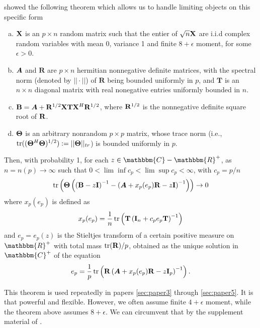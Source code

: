 \documentclass[oneside]{book}\usepackage{knitr}
\begin{document}
\citet{rubio2011spectral} showed the following theorem which allows us to handle limiting objects on this specific form
\begin{theorem}
\begin{enumerate}[(a)]
  \item $\mathbf{X}$ is an $p \times n$ random matrix such that the entier of $\sqrt{n}\mathbf{X}$ are i.i.d complex random variables with mean 0, variance 1 and finite $8+\epsilon$ moment, for some $\epsilon > 0$.
  \item $\mbox{\boldmath$A$}$ and $\mathbf{R}$ are $p \times n$ hermitian nonnegative definite matrices, with the spectral norm (denoted by $||\cdot||$) of $\mathbf{R}$ being bounded uniformly in $p$, and $\mathbf{T}$ is an $n \times n$ diagonal matrix with real nonegative entries  uniformly bounded in $n$.
  \item $\mathbf{B}=\mbox{\boldmath$A$} + \mathbf{R}^{1/2} \mathbf{X} \mathbf{T} \mathbf{X}^H \mathbf{R}^{1/2}$, where $\mathbf{R}^{1/2}$ is the nonnegative definite square root of $\mathbf{R}$.
  \item $\mathbf{\Theta}$ is an arbitrary nonrandom $p \times p$ matrix, whose trace norm (i.e., $\operatorname{tr}((\mathbf{\Theta}^H \mathbf{\Theta})^{1/2}):=||\mathbf{\Theta}||_{tr}$) is bounded uniformly in $p$.
\end{enumerate}
Then, with probability 1, for each $z\in \mathbbm{C}-\mathbbm{R}^+$, as $n=n(p) \rightarrow \infty$ such that $0<\lim\inf c_p<\lim \sup c_p < \infty$, with $c_p = p/n$
\begin{equation}
  \operatorname{tr}\left(\mathbf{\Theta}\left( \left(\mathbf{B} - z\mathbf{I}\right)^{-1} - \left( \mbox{\boldmath$A$} + x_p(e_p)\mathbf{R} - z\mathbf{I} \right)^{-1} \right) \right) \rightarrow 0
\end{equation}
where $x_p(e_p)$ is defined as
\begin{equation}
  x_p(e_p) = \frac{1}{n}\operatorname{tr} \left( \mathbf{T} \left(\mathbf{I}_n + c_p e_p \mathbf{T} \right)^{-1} \right)
\end{equation}
and $e_p=e_p(z)$ is the Stieltjes transform of a certain positive measure on $\mathbbm{R}^+$ with total mass $\operatorname{tr}(\mathbf{R})/p$, obtained as the unique solution in $\mathbbm{C}^+$ of the equation
\begin{equation}
  e_p = \frac{1}{p}\operatorname{tr} \left( \mathbf{R} \left(\mbox{\boldmath$A$} +  x_p(e_p) \mathbf{R} - z\mathbf{I}_p \right)^{-1} \right).
\end{equation}
\end{theorem}
This theorem is used repeatedly in papers \ref{sec:paper3} through \ref{sec:paper5}. 
It is that powerful and flexible. 
However, we often assume finite $4+\epsilon$ moment, while the theorem above assumes $8+\epsilon$. 
We can circumvent that by the supplement material of \citet{BodnarGuptaParolya2016}.
\end{document}

